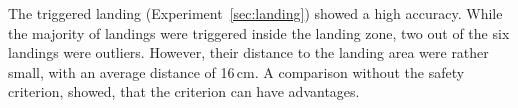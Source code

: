 The triggered landing (Experiment~\ref{sec:landing}) showed a high accuracy. While the majority of landings were triggered inside the landing zone, two out of the six landings were outliers. However, their distance to the landing area were rather small, with an average distance of 16\,cm. A comparison without the safety criterion, showed, that the criterion can have advantages. 